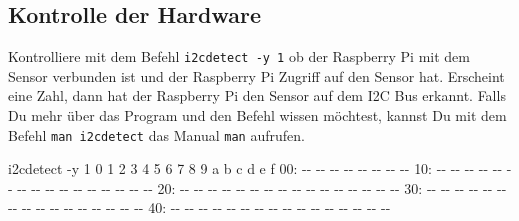 \documentclass[
  11pt,
  a4paperpaper,
  oneside, openany  ,captions=tableheading
]{scrbook}
\newenvironment{Shaded}{\begin{snugshade}}{\end{snugshade}}
\newcommand{\AttributeTok}[1]{\textcolor[rgb]{0.40,0.45,0.13}{#1}}
\newcommand{\ExtensionTok}[1]{\textcolor[rgb]{0.00,0.23,0.31}{#1}}
\newcommand{\NormalTok}[1]{\textcolor[rgb]{0.00,0.23,0.31}{#1}}
\theoremstyle{definition}
\theoremstyle{remark}
\begin{document}
\subsection{Kontrolle der Hardware}\label{kontrolle-der-hardware}

Kontrolliere mit dem Befehl \texttt{i2cdetect\ -y\ 1} ob der Raspberry
Pi mit dem Sensor verbunden ist und der Raspberry Pi Zugriff auf den
Sensor hat. Erscheint eine Zahl, dann hat der Raspberry Pi den Sensor
auf dem I2C Bus erkannt. Falls Du mehr über das Program und den Befehl
wissen möchtest, kannst Du mit dem Befehl \texttt{man\ i2cdetect} das
Manual \texttt{man} aufrufen.

\begin{Shaded}
\begin{Highlighting}[]
\ExtensionTok{i2cdetect} \AttributeTok{{-}y}\NormalTok{ 1}
     \ExtensionTok{0}\NormalTok{  1  2  3  4  5  6  7  8  9  a  b  c  d  e  f}
\ExtensionTok{00:}                         \AttributeTok{{-}{-}} \AttributeTok{{-}{-}} \AttributeTok{{-}{-}} \AttributeTok{{-}{-}} \AttributeTok{{-}{-}} \AttributeTok{{-}{-}} \AttributeTok{{-}{-}} \AttributeTok{{-}{-}} 
\ExtensionTok{10:} \AttributeTok{{-}{-}} \AttributeTok{{-}{-}} \AttributeTok{{-}{-}} \AttributeTok{{-}{-}} \AttributeTok{{-}{-}} \AttributeTok{{-}{-}} \AttributeTok{{-}{-}} \AttributeTok{{-}{-}} \AttributeTok{{-}{-}} \AttributeTok{{-}{-}} \AttributeTok{{-}{-}} \AttributeTok{{-}{-}} \AttributeTok{{-}{-}} \AttributeTok{{-}{-}} \AttributeTok{{-}{-}} \AttributeTok{{-}{-}} 
\ExtensionTok{20:} \AttributeTok{{-}{-}} \AttributeTok{{-}{-}} \AttributeTok{{-}{-}} \AttributeTok{{-}{-}} \AttributeTok{{-}{-}} \AttributeTok{{-}{-}} \AttributeTok{{-}{-}} \AttributeTok{{-}{-}} \AttributeTok{{-}{-}} \AttributeTok{{-}{-}} \AttributeTok{{-}{-}} \AttributeTok{{-}{-}} \AttributeTok{{-}{-}} \AttributeTok{{-}{-}} \AttributeTok{{-}{-}} \AttributeTok{{-}{-}} 
\ExtensionTok{30:} \AttributeTok{{-}{-}} \AttributeTok{{-}{-}} \AttributeTok{{-}{-}} \AttributeTok{{-}{-}} \AttributeTok{{-}{-}} \AttributeTok{{-}{-}} \AttributeTok{{-}{-}} \AttributeTok{{-}{-}} \AttributeTok{{-}{-}} \AttributeTok{{-}{-}} \AttributeTok{{-}{-}} \AttributeTok{{-}{-}} \AttributeTok{{-}{-}} \AttributeTok{{-}{-}} \AttributeTok{{-}{-}} \AttributeTok{{-}{-}} 
\ExtensionTok{40:} \AttributeTok{{-}{-}} \AttributeTok{{-}{-}} \AttributeTok{{-}{-}} \AttributeTok{{-}{-}} \AttributeTok{{-}{-}} \AttributeTok{{-}{-}} \AttributeTok{{-}{-}} \AttributeTok{{-}{-}} \AttributeTok{{-}{-}} \AttributeTok{{-}{-}} \AttributeTok{{-}{-}} \AttributeTok{{-}{-}} \AttributeTok{{-}{-}} \AttributeTok{{-}{-}} \AttributeTok{{-}{-}} \AttributeTok{{-}{-}} 

\end{Highlighting}
\end{Shaded}
\end{document}
